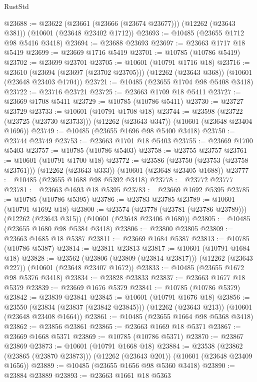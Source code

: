 \begin{lexlean}{RustStd}
\begin{coremodule}
@23688 := @23622
    (@23661 (@23666 (@23674 @23677)))
    (@12262 (@23643 @381))
    (@10601 (@23648 @23402 @1712))
@23693 := @10485 (@23655 @1712 @98 @5416 @3418)
@23694 := @23688 @23693
@23697 := @23663 @1717 @18 @5419
@23699 := @23669 @1716 @5419
@23701 := @10785 (@10786 @5419)
@23702 := @23699 @23701
@23705 := @10601 (@10791 @1716 @18)
@23716 := @23610
    (@23694 (@23697 (@23702 @23705)))
    (@12262 (@23643 @368))
    (@10601 (@23648 @23403 @1704))
@23721 := @10485 (@23655 @1704 @98 @5408 @3418)
@23722 := @23716 @23721
@23725 := @23663 @1709 @18 @5411
@23727 := @23669 @1708 @5411
@23729 := @10785 (@10786 @5411)
@23730 := @23727 @23729
@23733 := @10601 (@10791 @1708 @18)
@23744 := @23598
    (@23722 (@23725 (@23730 @23733)))
    (@12262 (@23643 @347))
    (@10601 (@23648 @23404 @1696))
@23749 := @10485 (@23655 @1696 @98 @5400 @3418)
@23750 := @23744 @23749
@23753 := @23663 @1701 @18 @5403
@23755 := @23669 @1700 @5403
@23757 := @10785 (@10786 @5403)
@23758 := @23755 @23757
@23761 := @10601 (@10791 @1700 @18)
@23772 := @23586
    (@23750 (@23753 (@23758 @23761)))
    (@12262 (@23643 @333))
    (@10601 (@23648 @23405 @1688))
@23777 := @10485 (@23655 @1688 @98 @5392 @3418)
@23778 := @23772 @23777
@23781 := @23663 @1693 @18 @5395
@23783 := @23669 @1692 @5395
@23785 := @10785 (@10786 @5395)
@23786 := @23783 @23785
@23789 := @10601 (@10791 @1692 @18)
@23800 := @23574
    (@23778 (@23781 (@23786 @23789)))
    (@12262 (@23643 @315))
    (@10601 (@23648 @23406 @1680))
@23805 := @10485 (@23655 @1680 @98 @5384 @3418)
@23806 := @23800 @23805
@23809 := @23663 @1685 @18 @5387
@23811 := @23669 @1684 @5387
@23813 := @10785 (@10786 @5387)
@23814 := @23811 @23813
@23817 := @10601 (@10791 @1684 @18)
@23828 := @23562
    (@23806 (@23809 (@23814 @23817)))
    (@12262 (@23643 @227))
    (@10601 (@23648 @23407 @1672))
@23833 := @10485 (@23655 @1672 @98 @5376 @3418)
@23834 := @23828 @23833
@23837 := @23663 @1677 @18 @5379
@23839 := @23669 @1676 @5379
@23841 := @10785 (@10786 @5379)
@23842 := @23839 @23841
@23845 := @10601 (@10791 @1676 @18)
@23856 := @23550
    (@23834 (@23837 (@23842 @23845)))
    (@12262 (@23643 @213))
    (@10601 (@23648 @23408 @1664))
@23861 := @10485 (@23655 @1664 @98 @5368 @3418)
@23862 := @23856 @23861
@23865 := @23663 @1669 @18 @5371
@23867 := @23669 @1668 @5371
@23869 := @10785 (@10786 @5371)
@23870 := @23867 @23869
@23873 := @10601 (@10791 @1668 @18)
@23884 := @23538
    (@23862 (@23865 (@23870 @23873)))
    (@12262 (@23643 @201))
    (@10601 (@23648 @23409 @1656))
@23889 := @10485 (@23655 @1656 @98 @5360 @3418)
@23890 := @23884 @23889
@23893 := @23663 @1661 @18 @5363

\end{coremodule}
\end{lexlean}

